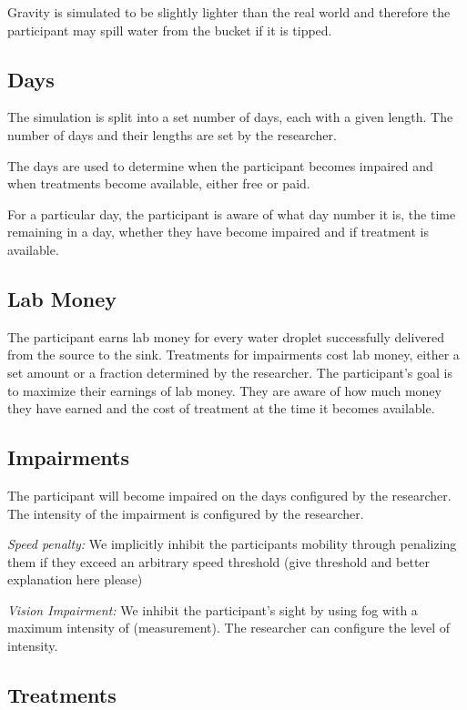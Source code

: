 \documentclass{article}
\begin{document}
Gravity is simulated to be slightly lighter than the real world and therefore the participant may spill water from the bucket if it is tipped.


\subsection{Days}

The simulation is split into a set number of days, each with a given length. The number of days and their lengths are set by the researcher.

The days are used to determine when the participant becomes impaired and when treatments become available, either free or paid.

For a particular day, the participant is aware of what day number it is, the time remaining in a day, whether they have become impaired and if treatment is available.

\subsection{Lab Money}

The participant earns lab money for every water droplet successfully delivered from the source to the sink. Treatments for impairments cost lab money, either a set amount or a fraction determined by the researcher. The participant’s goal is to maximize their earnings of lab money. They are aware of how much money they have earned and the cost of treatment at the time it becomes available.

\subsection{Impairments}

The participant will become impaired on the days configured by the researcher. The intensity of the impairment is configured by the researcher.

\emph{Speed penalty:}  We implicitly inhibit the participants mobility through penalizing them if they exceed an arbitrary speed threshold (give threshold and better explanation here please)

\emph{Vision Impairment:} We inhibit the participant’s sight by using fog with a maximum intensity of (measurement). The researcher can configure the level of intensity.

\subsection{Treatments}
\end{document}
